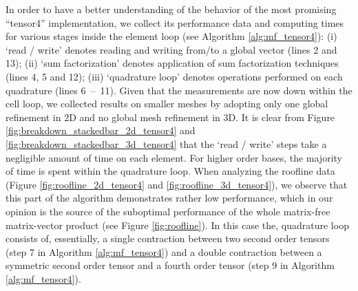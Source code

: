 \documentclass[times,doublespace]{nmeauth}
\begin{document}
In order to have a better understanding of the behavior of the most promising ``tensor4'' implementation,
we collect its performance data and computing times for various stages inside the element loop (see Algorithm \ref{alg:mf_tensor4}):
(i) `read / write' denotes reading and writing from/to a global vector (lines 2 and 13);
(ii) `sum factorization' denotes application of sum factorization techniques (lines 4, 5 and 12);
(iii) `quadrature loop' denotes operations performed on each quadrature (lines \mbox{6 -- 11}).
Given that the measurements are now down within the cell loop, we collected results on smaller meshes by adopting only one
global refinement in 2D and no global mesh refinement in 3D.
It is clear from Figure \ref{fig:breakdown_stackedbar_2d_tensor4} and  \ref{fig:breakdown_stackedbar_3d_tensor4} that the
`read / write' steps take a negligible amount of time on each element.
For higher order bases, the majority of time is spent within the quadrature loop.
When analyzing the roofline data (Figure \ref{fig:roofline_2d_tensor4} and \ref{fig:roofline_3d_tensor4}),
we observe that this part of the algorithm demonstrates rather low performance, which in our opinion is the source of the
suboptimal performance of the whole matrix-free matrix-vector product (see Figure \ref{fig:roofline}).
In this case the, quadrature loop consists of, essentially, a
single contraction between two second order tensors (step 7 in Algorithm \ref{alg:mf_tensor4}) and a
double contraction between a symmetric second order tensor and a fourth order tensor (step 9 in Algorithm \ref{alg:mf_tensor4}).
\end{document}
